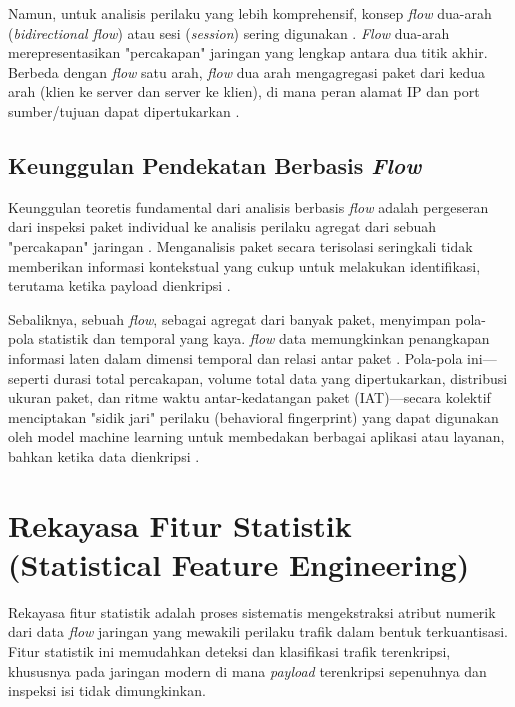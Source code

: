 Namun, untuk analisis perilaku yang lebih komprehensif, konsep \textit{flow} dua-arah (\textit{bidirectional flow}) atau sesi (\textit{session}) sering digunakan \citep{huoh2022flow}. \textit{Flow} dua-arah merepresentasikan "percakapan" jaringan yang lengkap antara dua titik akhir. Berbeda dengan \textit{flow} satu arah, \textit{flow} dua arah mengagregasi paket dari kedua arah (klien ke server dan server ke klien), di mana peran alamat IP dan port sumber/tujuan dapat dipertukarkan \citep{huoh2022flow}.

\subsection{Keunggulan Pendekatan Berbasis \textit{Flow}}
Keunggulan teoretis fundamental dari analisis berbasis \textit{flow} adalah pergeseran dari inspeksi paket individual ke analisis perilaku agregat dari sebuah "percakapan" jaringan \citep{huoh2022flow, Razooqi2025-bo}. Menganalisis paket secara terisolasi seringkali tidak memberikan informasi kontekstual yang cukup untuk melakukan identifikasi, terutama ketika payload dienkripsi \citep{lin2022bert}.

Sebaliknya, sebuah \textit{flow}, sebagai agregat dari banyak paket, menyimpan pola-pola statistik dan temporal yang kaya. \textit{flow} data memungkinkan penangkapan informasi laten dalam dimensi temporal dan relasi antar paket \citep{huoh2022flow}. Pola-pola ini—seperti durasi total percakapan, volume total data yang dipertukarkan, distribusi ukuran paket, dan ritme waktu antar-kedatangan paket (IAT)—secara kolektif menciptakan "sidik jari" perilaku (behavioral fingerprint) yang dapat digunakan oleh model machine learning untuk membedakan berbagai aplikasi atau layanan, bahkan ketika data dienkripsi \citep{Razooqi2025-bo}.

\section{Rekayasa Fitur Statistik (Statistical Feature Engineering)}
\label{sec:bab2-stat-feature}

Rekayasa fitur statistik adalah proses sistematis mengekstraksi atribut numerik dari data \textit{flow} jaringan yang mewakili perilaku trafik dalam bentuk terkuantisasi. Fitur statistik ini memudahkan deteksi dan klasifikasi trafik terenkripsi, khususnya pada jaringan modern di mana \textit{payload} terenkripsi sepenuhnya dan inspeksi isi tidak dimungkinkan.

